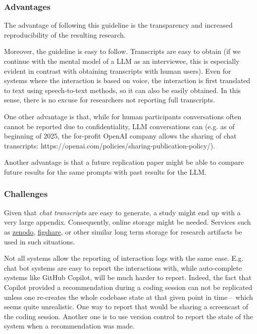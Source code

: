 

\subsubsection{Advantages}

The advantage of following this guideline is the transparency and increased reproducibility of the resulting research. 

Moreover, the guideline is easy to follow. Transcripts are easy to obtain (if we continue with the mental model of a LLM as an interviewee, this is especially evident in contrast with obtaining transcripts with human users). Even for systems where the interaction is based on voice, the interaction is first translated to text using speech-to-text methods, so it can also be easily obtained. In this sense, there is no excuse for researchers not reporting full transcripts. 

One other advantage is that, while for human participants conversations often cannot be reported due to confidentiality, LLM conversations can (e.g. as of beginning of 2025, the for-profit OpenAI company allows the sharing of chat transcripts: https://openai.com/policies/sharing-publication-policy/). 


Another advantage is that a future replication paper might be able to compare future results for the same prompts with past results for the LLM.


\subsubsection{Challenges}

Given that {\em chat transcripts} are easy to generate, a study might end up with a very large appendix. Consequently, online storage might be needed. Services such as \href{https://zenodo.org}{zenodo}, \href{https://figshare.com/}{figshare}, or other similar long term storage for research artifacts \should be used in such situations.

Not all systems allow the reporting of interaction logs with the same ease. E.g. chat bot systems are easy to report the interactions with, while auto-complete systems like GitHub Copilot, will be much harder to report. Indeed, the fact that Copilot provided a recommendation during a coding session can not be replicated unless one re-creates the whole codebase state at that given point in time -- which seems quite unrealistic. One way to report that would be sharing a screencast of the coding session. Another one is to use version control to report the state of the system when a recommendation was made.

